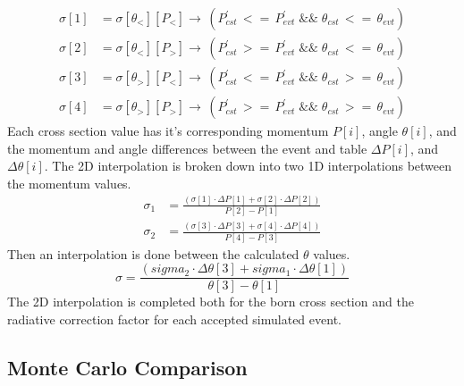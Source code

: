 \begin{align}
 	\sigma[1] &=\sigma[\theta_<][P_<]\rightarrow\,(P^{\prime}_{cst}\, <=\, P^{\prime}_{evt}\; \&\& \;\theta_{cst}\, <=\, \theta_{evt}) \nonumber\\
	\sigma[2] &=\sigma[\theta_<][P_>]\rightarrow\,(P^{\prime}_{cst}\, >=\, P^{\prime}_{evt}\; \&\& \;\theta_{cst}\, <=\, \theta_{evt}) \nonumber\\
	\sigma[3] &=\sigma[\theta_>][P_<]\rightarrow\,(P^{\prime}_{cst}\, <=\, P^{\prime}_{evt}\; \&\& \;\theta_{cst}\, >=\, \theta_{evt}) \nonumber\\
	\sigma[4] &=\sigma[\theta_>][P_>]\rightarrow\,(P^{\prime}_{cst}\, >=\, P^{\prime}_{evt}\; \&\& \;\theta_{cst}\, >=\, \theta_{evt})
\end{align}
Each cross section value has it's corresponding momentum $P[i]$, angle $\theta[i]$, and the momentum and angle differences between the event and table  $\Delta P[i]$, and $\Delta \theta[i]$. The 2D interpolation is broken down into two 1D interpolations between the momentum values.
\begin{align}
\sigma_1 &= \frac{\left(\sigma[1] \cdot \Delta P[1] +  \sigma[2] \cdot \Delta P[2] \right)} {P[2]-P[1]}\nonumber\\
\sigma_2 &= \frac{\left(\sigma[3] \cdot \Delta P[3] +  \sigma[4] \cdot \Delta P[4] \right)} {P[4]-P[3]}
\end{align}
Then an interpolation is done between the calculated $\theta$ values.
\begin{equation}
\sigma = \frac{\left(sigma_2 \cdot \Delta \theta[3] + sigma_1 \cdot \Delta \theta[1]\right) }{\theta[3] -\theta[1]}
\end{equation}
The 2D interpolation is completed both for the born cross section and the radiative correction factor for each accepted simulated event.
\subsection{Monte Carlo Comparison}
